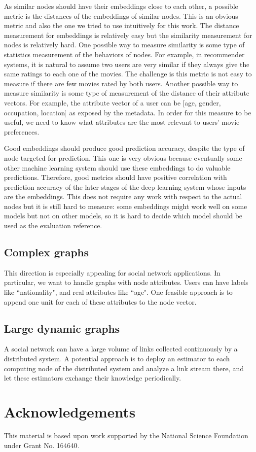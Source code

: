 \documentclass[11pt,twocolumn]{article}
\begin{document}
As similar nodes should have their embeddings close to each other, a possible metric is the distances of the embeddings of similar nodes.
This is an obvious metric and also the one we tried to use intuitively for this work.
The distance measurement for embeddings is relatively easy but the similarity measurement for nodes is relatively hard.
One possible way to measure similarity is some type of statistics measurement of the behaviors of nodes.
For example, in recommender systems, it is natural to assume two users are very similar if they always give the same ratings to each one of the movies.
The challenge is this metric is not easy to measure if there are few movies rated by both users.
Another possible way to measure similarity is some type of measurement of the distance of their attribute vectors.
For example, the attribute vector of a user can be [age, gender, occupation, location] as exposed by the metadata.
In order for this measure to be useful, we need to know what attributes are the most relevant to users' movie preferences.

Good embeddings should produce good prediction accuracy, despite the type of node targeted for prediction.
This one is very obvious because eventually some other machine learning system should use these embeddings to do valuable predictions.
Therefore, good metrics should have positive correlation with prediction accuracy of the later stages of the deep learning system whose inputs are the embeddings.
This does not require any work with respect to the actual nodes but it is still hard to measure: some embeddings might work well on some models but not on other models, so it is hard to decide which model should be used as the evaluation reference.

\subsection{Complex graphs}
This direction is especially appealing for social network applications.
In particular, we want to handle graphs with node attributes.
Users can have labels like ``nationality", and real attributes like ``age".
One feasible approach is to append one unit for each of these attributes to the node vector.

\subsection{Large dynamic graphs}
A social network can have a large volume of links collected continuously by a
distributed system.
A potential approach is to deploy an estimator to each computing node of
the distributed system and analyze a link stream there,
and let these estimators exchange their knowledge periodically.

\section*{Acknowledgements}
This material is based upon work supported by the National Science Foundation under Grant No. 164640.



\end{document}
